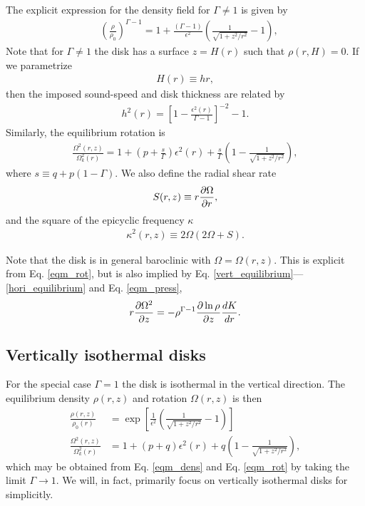 The explicit expression for the density field for
$\Gamma\neq1$ is given  by
\begin{align}\label{eqm_dens}
  &\left(\frac{\rho}{\rho_0}\right)^{\Gamma-1} = 1 +
  \frac{\left(\Gamma-1\right)}{\epsilon^2}\left(\frac{1}{\sqrt{1+z^2/r^2}}-1\right),
\end{align}
Note that for $\Gamma\neq1$ the disk has a surface $z=H(r)$ such that
$\rho(r,H)=0$. If we parametrize
\begin{align}
  H(r)\equiv h r,
\end{align}
then the imposed sound-speed and disk thickness are related by 
\begin{align}
  h^2(r) = \left[1-\frac{\epsilon^2(r)}{\Gamma-1}\right]^{-2}-1. 
\end{align}
Similarly, the equilibrium rotation is 
\begin{align}\label{eqm_rot}
  \frac{\Omega^2(r,z)}{\Omega_k^2(r)}=1 +
  \left(p+\frac{s}{\Gamma}\right)\epsilon^2(r) 
  +\frac{s}{\Gamma} \left(1-\frac{1}{\sqrt{1+z^2/r^2}}\right), 
\end{align}
where $s\equiv q+p(1-\Gamma)$. We also define the radial shear rate  
\begin{align}
  S(r,z) \equiv r\frac{\partial\Omega}{\partial r},  
\end{align}
and the square of the epicyclic frequency $\kappa$ 
\begin{align}
  \kappa^2(r,z) \equiv 2\Omega(2\Omega + S). 
\end{align}

Note that the disk is in general baroclinic with $\Omega =
\Omega(r,z)$. This is explicit from Eq. \ref{eqm_rot}, but is also
implied by Eq. \ref{vert_equilibrium}---\ref{hori_equilibrium} and 
Eq. \ref{eqm_press},  
\begin{align}
  r\frac{\partial\Omega^2}{\partial z} = - \rho^{\Gamma-1}\frac{\partial\ln\rho}{\partial
    z}\frac{dK}{dr}.\label{vertical_shear}
\end{align}



\subsection{Vertically isothermal disks}
For the special case $\Gamma=1$ the disk is isothermal in the
vertical direction. The equilibrium density $\rho(r,z)$ and rotation
$\Omega(r,z)$ is then 
\begin{align}
  \frac{\rho(r,z)}{\rho_0(r)} &=
  \exp{\left[\frac{1}{\epsilon^2}\left(\frac{1}{\sqrt{1+z^2/r^2}}-1\right)\right]}\\    
  \frac{\Omega^2(r,z)}{\Omega_k^2(r)}& =1+ (p+q)\epsilon^2(r) + q\left(1 -
    \frac{1}{\sqrt{1+z^2/r^2}}\right),\label{vertiso_eqm}
\end{align}
which may be obtained from Eq. \ref{eqm_dens} and Eq. \ref{eqm_rot} by
taking the limit $\Gamma\to 1$. We will, in fact, primarily focus on
vertically isothermal disks for simplicitly. 

